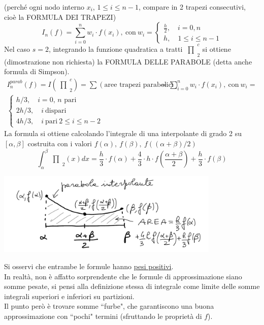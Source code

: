 \documentclass[12pt,a4paper]{article}
\newcommand{\inter}{\begin{matrix}\prod\end{matrix}}
\begin{document}
(perché ogni nodo interno $x_i$, $1 \leq i \leq n-1$, compare in 2 trapezi consecutivi, cioè la FORMULA DEI TRAPEZI)
\[
I_n (f) = \sum_{i=0}^n w_i \cdot f(x_i), \ \text{con} \ w_i =
\begin{cases}
\frac{h}{2}, \quad i=0,n \\
h, \quad 1 \le i \le n-1
\end{cases}
\]
Nel caso $s=2$, integrando la funzione quadratica a tratti $\inter_2^c$ si ottiene (dimostrazione non richiesta) la FORMULA DELLE PARABOLE (detta anche formula di Simpson).
\[
\begin{split}
I_n^{parab} (f) = I \left(\inter_2^c\right) = \sum (\text{aree trapezi parabolici}) 
& = \sum_{i=0}^n w_i \cdot f(x_i), \ \text{con} \ w_i = \\
\begin{cases}
h/3,  \quad i=0, \, n \text { pari}\\
2h/3, \quad i \ \text{dispari}\\
4h/3, \quad i \ \text{pari} \ 2 \leq i \leq n-2
\end{cases}
\end{split}
\]
La formula si ottiene calcolando l'integrale di una interpolante di grado 2 su $[\alpha, \beta]$ costruita con i valori $f(\alpha), \ f(\beta), \ f((\alpha+\beta)/2)$
\[
\int_\alpha^\beta \inter_2 (x) dx = \frac{h}{3} \cdot f(\alpha) + \frac{4}{3} \cdot h \cdot f\left(\frac{\alpha + \beta}{2}\right) + \frac{h}{3} \cdot f(\beta)
\]
\begin{center}
    \includegraphics[width=0.8\textwidth]{pag21.png}
\end{center}
Si osservi che entrambe le formule hanno \uline{pesi positivi}.\\
In realtà, non è affatto sorprendente che le formule di approssimazione siano somme pesate, si pensi alla definizione stessa di integrale come limite delle somme integrali superiori e inferiori su partizioni.\\
Il punto però è trovare somme ``furbe", che garantiscono una buona approssimazione con ``pochi" termini (sfruttando le proprietà di $f$).
\end{document}
